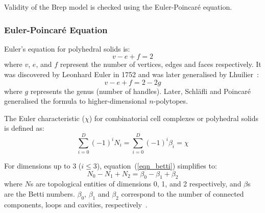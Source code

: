 \documentclass[11pt,a4paper]{article}
\newtheorem{theorem}{Theorem}[section]
\newcommand{\Betti}[1]{\beta_{#1}}    %
\newcommand{\Zk}[1]{Z_{#1}}          %
\newcommand{\Bk}[1]{B_{#1}}          %
\begin{document}
Validity of the Brep model is checked using the Euler-Poincar\'e equation.

\subsubsection{Euler-Poincar\'e Equation}

Euler's equation for polyhedral solids is:
\begin{equation}
  v - e + f = 2
\end{equation}
where $v$, $e$, and $f$ represent the number of vertices, edges and faces
respectively. It was discovered by Leonhard Euler in 1752 and was later
generalised by Lhuilier~\cite{Krishnamurti2002}:
\begin{equation}
  v - e + f = 2 - 2g
\end{equation}
where $g$ represents the genus (number of handles). Later, Schl\"afli and
Poincar\'e generalised the formula to higher-dimensional $n$-polytopes.

%
%

The Euler characteristic ($\chi$) for combinatorial cell complexes or
polyhedral solids is defined as:
\begin{equation}
  \sum_{i=0}^{D}(-1)^{i} N_{i}= \sum_{i=0}^{D}(-1)^{i} \beta_{i} = \chi
  \label{eqn_betti}
\end{equation}

For dimensions up to 3 ($i \leq 3$), equation~(\ref{eqn_betti}) simplifies to:
\begin{equation}
  N_{0}-N_{1}+N_{2}= \beta_{0} -\beta_{1} + \beta_{2}
  \label{eqn_betti3}
\end{equation}
where $N$s are topological entities of dimensions 0, 1, and 2 respectively,
and $\beta$s are the Betti numbers. $\beta_{0}$, $\beta_{1}$ and $\beta_{2}$
correspond to the number of connected components, loops and cavities,
respectively~\cite{Sequin}.
\end{document}
